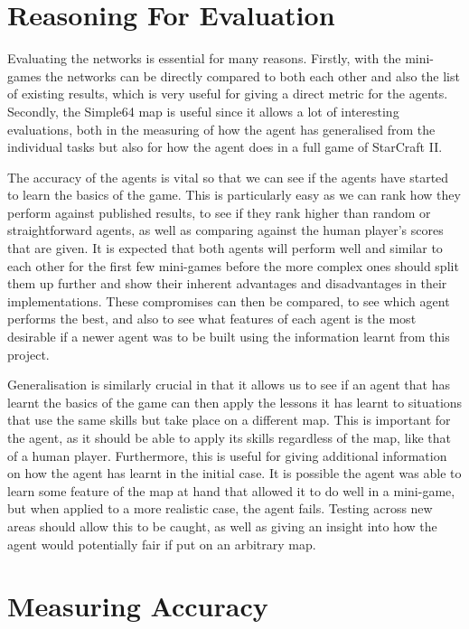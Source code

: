 \section{Reasoning For Evaluation}

Evaluating the networks is essential for many reasons. Firstly, with the
mini-games the networks can be directly compared to both each other and also the
list of existing results, which is very useful for giving a direct metric for
the agents. Secondly, the Simple64 map is useful since it allows a lot of
interesting evaluations, both in the measuring of how the agent has generalised
from the individual tasks but also for how the agent does in a full game of
StarCraft II\@.

The accuracy of the agents is vital so that we can see if the agents have
started to learn the basics of the game. This is particularly easy as we can
rank how they perform against published results, to see if they rank higher than
random or straightforward agents, as well as comparing against the human
player's scores that are given. It is expected that both agents will perform
well and similar to each other for the first few mini-games before the more
complex ones should split them up further and show their inherent advantages and
disadvantages in their implementations. These compromises can then be compared,
to see which agent performs the best, and also to see what features of each
agent is the most desirable if a newer agent was to be built using the
information learnt from this project.

Generalisation is similarly crucial in that it allows us to see if an agent that
has learnt the basics of the game can then apply the lessons it has learnt to
situations that use the same skills but take place on a different map. This is
important for the agent, as it should be able to apply its skills regardless of
the map, like that of a human player. Furthermore, this is useful for giving
additional information on how the agent has learnt in the initial case. It is
possible the agent was able to learn some feature of the map at hand that
allowed it to do well in a mini-game, but when applied to a more realistic case,
the agent fails. Testing across new areas should allow this to be caught, as
well as giving an insight into how the agent would potentially fair if put on an
arbitrary map.

\section{Measuring Accuracy}

